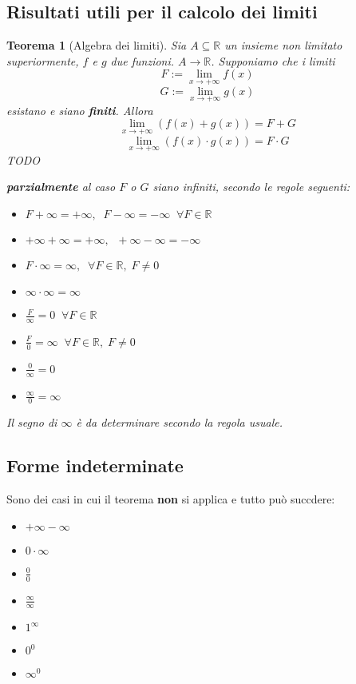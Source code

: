\documentclass[a4paper]{article}
\newtheorem{theorem}{Teorema}
\theoremstyle{break}
\theoremstyle{break}
\theoremstyle{break}
\theoremstyle{break}
\begin{document}
\subsection{Risultati utili per il calcolo dei limiti}
\begin{theorem}[Algebra dei limiti]
	Sia \( A \subseteq \mathbb{R} \) un insieme non limitato superiormente, \( f \) e \( g \)
	due funzioni. \( A \to \mathbb{R} \). Supponiamo che i limiti
	\[
		F:= \lim_{x \to +\infty} f(x)
	\]
	\[
		G:= \lim_{x \to +\infty} g(x)
	\]
	esistano e siano \textbf{finiti}. Allora
	\[
		\lim_{x \to +\infty} (f(x) + g(x)) = F+G
	\]
	\[
		\lim_{x \to +\infty} (f(x) \cdot g(x)) = F \cdot G
	\]
	TODO

	\textbf{parzialmente} al caso \( F \) o \( G \) siano infiniti, secondo
	le regole seguenti:
	\begin{itemize}
		\item \(
		      F + \infty = +\infty,\;\; F - \infty = -\infty\;\; \forall F \in \mathbb{R}
		      \)
		\item \(
		      +\infty + \infty = +\infty,\;\; +\infty - \infty = -\infty
		      \)
		\item \(
		      F \cdot \infty = \infty, \;\; \forall F \in \mathbb{R},\; F \neq 0
		      \)
		\item \(
		      \infty \cdot \infty = \infty
		      \)
		\item \(
		      \frac{F}{\infty} = 0 \;\; \forall F \in \mathbb{R}
		      \)
		\item \(
		      \frac{F}{0} = \infty \;\; \forall F \in \mathbb{R},\; F \neq 0
		      \)
		\item \(
		      \frac{0}{\infty} = 0
		      \)
		\item \(
		      \frac{\infty}{0} = \infty
		      \)
	\end{itemize}
	Il segno di \( \infty \) è da determinare secondo la regola usuale.
\end{theorem}

\subsection{Forme indeterminate}
Sono dei casi in cui il teorema \textbf{non} si applica e tutto può succdere:
\begin{itemize}
	\item \( +\infty - \infty \)
	\item \( 0 \cdot \infty \)
	\item \( \frac{0}{0} \)
	\item \( \frac{\infty}{\infty} \)
	\item \( 1^{\infty} \)
	\item \( 0^{0} \)
	\item \( \infty^{0} \)
\end{itemize}
\end{document}
